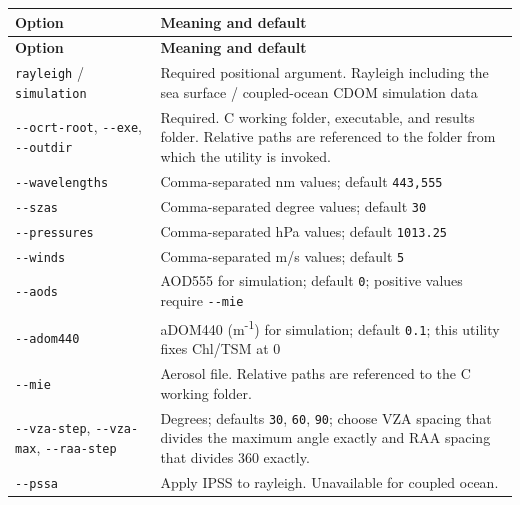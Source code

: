 {\TableFont
\begin{longtable}{@{}>{\raggedright\arraybackslash}p{}>{\raggedright\arraybackslash}p{}@{}}
\toprule
\textbf{Option} & \textbf{Meaning and default} \\
\midrule
\endfirsthead
\toprule
\textbf{Option} & \textbf{Meaning and default} \\
\midrule
\endhead
\bottomrule
\endfoot
\texttt{rayleigh} / \texttt{simulation} & Required positional argument. Rayleigh including the sea surface / coupled-ocean CDOM simulation data \\
\texttt{-\allowbreak{}-\allowbreak{}ocrt-\allowbreak{}root}, \texttt{-\allowbreak{}-\allowbreak{}exe}, \texttt{-\allowbreak{}-\allowbreak{}outdir} & Required. C working folder, executable, and results folder. Relative paths are referenced to the folder from which the utility is invoked. \\
\texttt{-\allowbreak{}-\allowbreak{}wavelengths} & Comma-separated nm values; default \texttt{443,\allowbreak{}555} \\
\texttt{-\allowbreak{}-\allowbreak{}szas} & Comma-separated degree values; default \texttt{30} \\
\texttt{-\allowbreak{}-\allowbreak{}pressures} & Comma-separated hPa values; default \texttt{1013.\allowbreak{}25} \\
\texttt{-\allowbreak{}-\allowbreak{}winds} & Comma-separated m/s values; default \texttt{5} \\
\texttt{-\allowbreak{}-\allowbreak{}aods} & AOD555 for simulation; default \texttt{0}; positive values require \texttt{-\allowbreak{}-\allowbreak{}mie} \\
\texttt{-\allowbreak{}-\allowbreak{}adom440} & aDOM440 (m\textsuperscript{-}\textsuperscript{1}) for simulation; default \texttt{0.\allowbreak{}1}; this utility fixes Chl/TSM at 0 \\
\texttt{-\allowbreak{}-\allowbreak{}mie} & Aerosol file. Relative paths are referenced to the C working folder. \\
\texttt{-\allowbreak{}-\allowbreak{}vza-\allowbreak{}step}, \texttt{-\allowbreak{}-\allowbreak{}vza-\allowbreak{}max}, \texttt{-\allowbreak{}-\allowbreak{}raa-\allowbreak{}step} & Degrees; defaults \texttt{30}, \texttt{60}, \texttt{90}; choose VZA spacing that divides the maximum angle exactly and RAA spacing that divides 360 exactly. \\
\texttt{-\allowbreak{}-\allowbreak{}pssa} & Apply IPSS to rayleigh. Unavailable for coupled ocean. \\

\end{longtable}}
